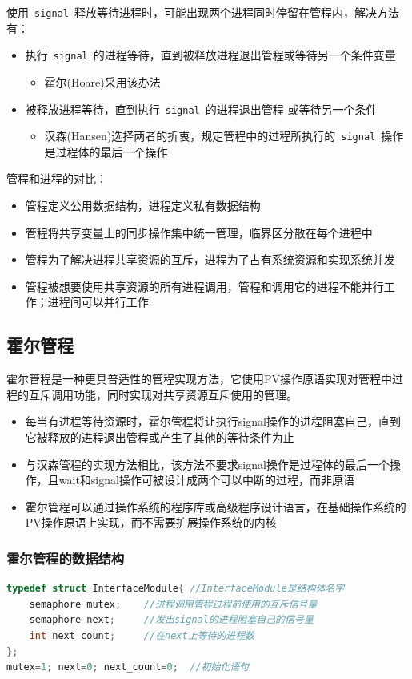 \documentclass[cs4size,a4paper,10pt]{ctexart}
\begin{document}
	使用\ \verb|signal|\ 释放等待进程时，可能出现两个进程同时停留在管程内，解决方法有：
	\begin{itemize}
		\item 执行\ \verb|signal|\ 的进程等待，直到被释放进程退出管程或等待另一个条件变量
		\begin{itemize}
			\item 霍尔(Hoare)采用该办法
		\end{itemize}
		\item 被释放进程等待，直到执行\ \verb|signal|\ 的进程退出管程 或等待另一个条件
		\begin{itemize}
			\item 汉森(Hansen)选择两者的折衷，规定管程中的过程所执行的\ \verb|signal|\ 操作是过程体的最后一个操作
		\end{itemize}
	\end{itemize}

	管程和进程的对比：
	\begin{itemize}
		\item 管程定义公用数据结构，进程定义私有数据结构
		\item 管程将共享变量上的同步操作集中统一管理，临界区分散在每个进程中
		\item 管程为了解决进程共享资源的互斥，进程为了占有系统资源和实现系统并发
		\item 管程被想要使用共享资源的所有进程调用，管程和调用它的进程不能并行工作；进程间可以并行工作
	\end{itemize}

	\subsection{霍尔管程}
	霍尔管程是一种更具普适性的管程实现方法，它使用PV操作原语实现对管程中过程的互斥调用功能，同时实现对共享资源互斥使用的管理。
	\begin{itemize}
		\item 每当有进程等待资源时，霍尔管程将让执行signal操作的进程阻塞自己，直到它被释放的进程退出管程或产生了其他的等待条件为止
		\item 与汉森管程的实现方法相比，该方法不要求signal操作是过程体的最后一个操作，且wait和signal操作可被设计成两个可以中断的过程，而非原语
		\item 霍尔管程可以通过操作系统的程序库或高级程序设计语言，在基础操作系统的PV操作原语上实现，而不需要扩展操作系统的内核
	\end{itemize}

	\subsubsection{霍尔管程的数据结构}
	\begin{lstlisting}[language=C,keywordstyle=\color{black}]
typedef struct InterfaceModule{ //InterfaceModule是结构体名字
	semaphore mutex; 	//进程调用管程过程前使用的互斥信号量
	semaphore next; 	//发出signal的进程阻塞自己的信号量
	int next_count; 	//在next上等待的进程数
};
mutex=1; next=0; next_count=0;	//初始化语句
	\end{lstlisting}
\end{document}
